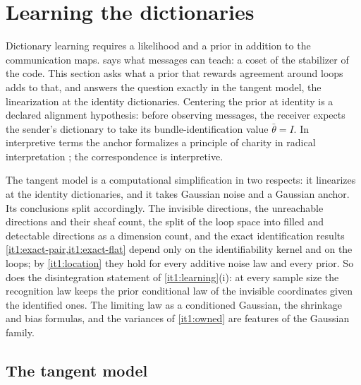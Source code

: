 \section{Learning the dictionaries}
\label{it1:ch-learning}

Dictionary learning requires a likelihood and a prior in addition to the communication maps.  says what messages can teach: a coset of the stabilizer of the code. This section asks what a prior that rewards agreement around loops adds to that, and answers the question exactly in the tangent model, the linearization at the identity dictionaries. Centering the prior at identity is a declared alignment hypothesis: before observing messages, the receiver expects the sender's dictionary to take its bundle-identification value $\bar\theta=I$. In interpretive terms the anchor formalizes a principle of charity in radical interpretation \citep{Davidson1973}; the correspondence is interpretive.

The tangent model is a computational simplification in two respects: it linearizes at the identity dictionaries, and it takes Gaussian noise and a Gaussian anchor. Its conclusions split accordingly. The invisible directions, the unreachable directions and their sheaf count, the split of the loop space into filled and detectable directions as a dimension count, and the exact identification results \cref{it1:exact-pair,it1:exact-flat} depend only on the identifiability kernel and on the loops; by \cref{it1:location} they hold for every additive noise law and every prior. So does the disintegration statement of \cref{it1:learning}(i): at every sample size the recognition law keeps the prior conditional law of the invisible coordinates given the identified ones. The limiting law as a conditioned Gaussian, the shrinkage and bias formulas, and the variances of \cref{it1:owned} are features of the Gaussian family.

\subsection{The tangent model}

